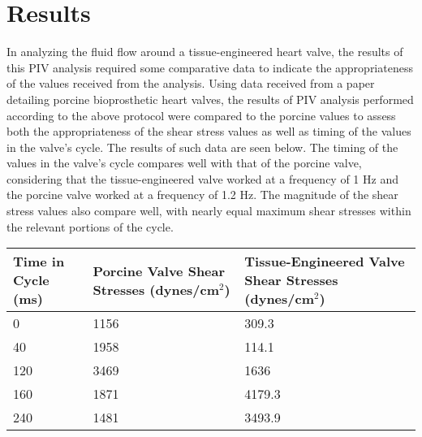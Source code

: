\documentclass{article}
\begin{document}
\section*{Results}
In analyzing the fluid flow around a tissue-engineered heart valve, the results of this PIV analysis required some comparative data to indicate the appropriateness of the values received from the analysis. Using data received from a paper detailing porcine bioprosthetic heart valves, the results of PIV analysis performed according to the above protocol were compared to the porcine values to assess both the appropriateness of the shear stress values as well as timing of the values in the valve's cycle. The results of such data are seen below. The timing of the values in the valve's cycle compares well with that of the porcine valve, considering that the tissue-engineered valve worked at a frequency of 1 Hz and the porcine valve worked at a frequency of 1.2 Hz. The magnitude of the shear stress values also compare well, with nearly equal maximum shear stresses within the relevant portions of the cycle. 

\begin{table}[h]
\begin{tabular}{|p{3.5cm}|p{3.5cm}|p{3.5cm}|} \hline
Time in Cycle (ms) & Porcine Valve Shear Stresses (dynes/cm$^{2}$) & Tissue-Engineered Valve Shear Stresses (dynes/cm$^{2}$)  \\ \hline
0                                      & 1156                                                                          & 309.3                                                                                  \\ \hline
40                                     & 1958                                                                          & 114.1                                                                                  \\ \hline
120                                    & 3469                                                                          & 1636                                                                                   \\ \hline 
160                                    & 1871                                                                          & 4179.3                                                                                 \\ \hline 
240                                    & 1481                                                                          & 3493.9 \\ \hline                                                                              
\end{tabular}
\end{table}
\end{document}
